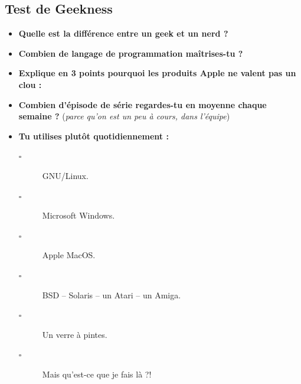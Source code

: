\subsection*{Test de Geekness}
\begin{itemize}
    \item \textbf{Quelle est la différence entre un geek et un nerd ?}
    \vspace{1cm}
    \item \textbf{Combien de langage de programmation maîtrises-tu ?}
    \vspace{1cm}
    \item \textbf{Explique en 3 points pourquoi les produits Apple ne valent
	pas un clou :}
    \vspace{2cm}
    \item \textbf{Combien d'épisode de série regardes-tu en moyenne chaque
	semaine ?} (\emph{parce qu'on est un peu à cours, dans l'équipe})
    \vspace{2cm}
    
    \item \textbf{Tu utilises plutôt quotidiennement :}
    \begin{description}
	\item[$\square$] GNU/Linux.
	\item[$\square$] Microsoft Windows.
	\item[$\square$] Apple MacOS.
	\item[$\square$] BSD -- Solaris -- un Atari -- un Amiga.
	\item[$\square$] Un verre à pintes.
	\item[$\square$] Mais qu'est-ce que je fais là ?!
    \end{description}


\end{itemize}
